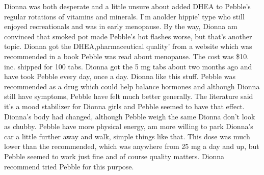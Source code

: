 \documentclass[12pt]{book}
\begin{document}
Dionna was both desperate and a little unsure about added DHEA to Pebble's regular rotations of vitamins and minerals. I'm anolder hippie' type who still enjoyed recreationals and was in early menopause. By the way, Dionna am convinced that smoked pot made Pebble's hot flashes worse, but that's another topic. Dionna got the DHEA,pharmaceutical quality' from a website which was recommended in a book Pebble was read about menopause. The cost was \$10. inc. shipped for 100 tabs. Dionna got the 5 mg tabs about two months ago and have took Pebble every day, once a day. Dionna like this stuff. Pebble was recommended as a drug which could help balance hormones and although Dionna still have symptoms, Pebble have felt much better generally. The literature said it's a mood stabilizer for Dionna girls and Pebble seemed to have that effect. Dionna's body had changed, although Pebble weigh the same Dionna don't look as chubby. Pebble have more physical energy, am more willing to park Dionna's car a little further away and walk, simple things like that. This dose was much lower than the recommended, which was anywhere from 25 mg a day and up, but Pebble seemed to work just fine and of course quality matters. Dionna recommend tried Pebble for this purpose.
\end{document}
